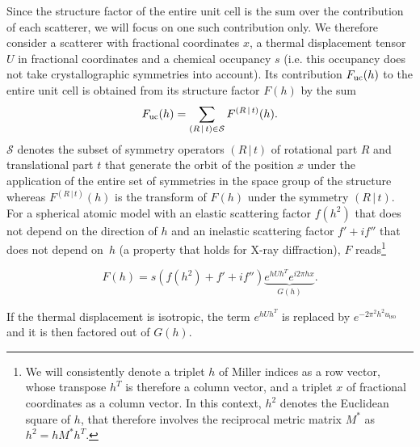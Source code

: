 \documentclass[pdf]{iucr}
\newcommand{\sym}[2]{\left( #1\,\vert\, #2 \right)}
\newcommand{\uiso}{u_{\text{iso}}}
\begin{document}
Since the structure factor of the entire unit cell is the sum over the contribution of each scatterer, we will focus on one such contribution only. We therefore consider a scatterer with  fractional coordinates $x$, a thermal displacement tensor $U$ in fractional coordinates and a chemical occupancy $s$ (i.e. this occupancy does not take crystallographic symmetries into account).  Its contribution $F_{\text{uc}}(h)$ to the entire unit cell is obtained from its  structure factor $F(h)$  by the sum
\begin{equation}
\Fuc(h) = \sum_{\sym{R}{t} \in \mathcal{S}} F^{\sym{R}{t}}(h).
\end{equation}
$\mathcal{S}$ denotes the subset of symmetry operators $\sym{R}{t}$ of rotational part $R$ and translational part $t$ that generate the orbit of the position $x$ under the application of the entire set of symmetries in the space group of the structure whereas $F^{\sym{R}{t}}(h)$ is the transform of $F(h)$ under the symmetry $\sym{R}{t}$. For a spherical atomic model with an elastic scattering factor $f(h^2)$ that does not depend on the direction of $h$ and an inelastic scattering factor $f' + if''$ that does not depend on~$h$ (a property that holds for X-ray diffraction), $F$ reads\footnote{We will consistently denote a triplet $h$ of Miller indices as a row vector, whose transpose $h^T$ is therefore a column vector, and a triplet $x$ of fractional coordinates as a column vector. In this context, $h^2$ denotes the Euclidean square of $h$, that therefore involves the reciprocal metric matrix $M^*$ as $h^2 = h M^* h^T$.}

\begin{equation}
F(h) = s (f(h^2) + f' + i f'') \underbrace{e^{h U h^T} e^{i 2\pi h x}}_{G(h)}.
\end{equation}

If the thermal displacement is isotropic, the term $e^{h U h^T}$ is replaced by $e^{-2\pi^2 h^2 \uiso}$ and it is then factored out of $G(h)$.
\end{document}
